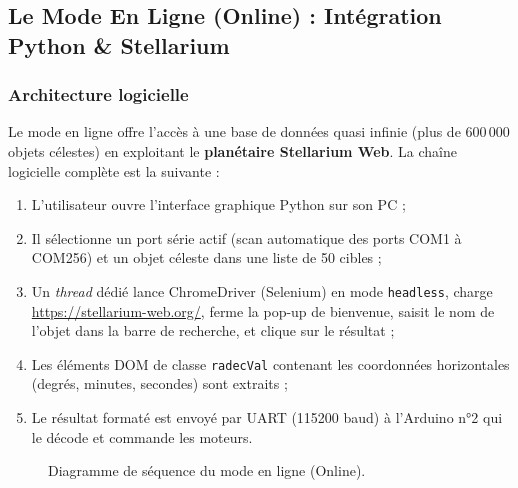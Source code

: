 \documentclass[12pt,a4paper]{report}
\begin{document}
\begin{enumerate}
\subsection{Le Mode En Ligne (Online) : Intégration Python \& Stellarium}
\subsubsection{Architecture logicielle}
Le mode en ligne offre l'accès à une base de données quasi infinie (plus de 600\,000 objets célestes) en exploitant le \textbf{planétaire Stellarium Web}. La chaîne logicielle complète est la suivante :
\begin{enumerate}
    \item L'utilisateur ouvre l'interface graphique Python sur son PC ;
    \item Il sélectionne un port série actif (scan automatique des ports COM1 à COM256) et un objet céleste dans une liste de 50 cibles ;
    \item Un \textit{thread} dédié lance ChromeDriver (Selenium) en mode \texttt{headless}, charge \url{https://stellarium-web.org/}, ferme la pop-up de bienvenue, saisit le nom de l'objet dans la barre de recherche, et clique sur le résultat ;
    \item Les éléments DOM de classe \texttt{radecVal} contenant les coordonnées horizontales (degrés, minutes, secondes) sont extraits ;
    \item Le résultat formaté est envoyé par UART (115200 baud) à l'Arduino n°2 qui le décode et commande les moteurs.
\end{enumerate}

\begin{figure}[H]
    \centering
    \caption{Diagramme de séquence du mode en ligne (Online).}
    \label{fig:seq_online}
\end{figure}


\end{enumerate}
\end{document}
